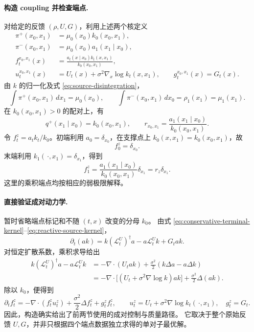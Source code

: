 \documentclass[UTF8,a4paper,11pt,fontset=fandol]{ctexart}
\begin{document}
\paragraph{构造 coupling 并检查端点.}
对给定的反馈 $(\rho,U,G)$，利用上述两个核定义
\begin{equation}
\begin{aligned}
\pi^+(x_0,x_1)&=\mu_0(x_0)k_0(x_0,x_1),\\
\pi^-(x_0,x_1)&=\mu_0(x_0)a_1(x_1\mid x_0),\\
f_t^{x_0,x_1}(x)
&=\frac{a_t(x\mid x_0)k_t(x,x_1)}{k_0(x_0,x_1)},\\
u_t^{x_0,x_1}(x)&=U_t(x)+\sigma^2\nabla_x\log k_t(x,x_1),
\qquad g_t^{x_0,x_1}(x)=G_t(x).
\end{aligned}
\label{eq:feedback-pair-lift}
\end{equation}
由 $k$ 的归一化及式 \eqref{eq:source-disintegration}，
\begin{equation}
\int\pi^+(x_0,x_1)\,dx_1=\mu_0(x_0),
\qquad
\int\pi^-(x_0,x_1)\,dx_0=\rho_1(x_1)=\mu_1(x_1).
\end{equation}
在 $k_0(x_0,x_1)>0$ 的配对上，有
\begin{equation}
q^+(x_1\mid x_0)=k_0(x_0,x_1),
\qquad
r_{x_0,x_1}=\frac{a_1(x_1\mid x_0)}{k_0(x_0,x_1)}.
\end{equation}
令 $f_t^z=a_tk_t/k_0$。初端利用
$a_0=\delta_{x_0}$，在支撑点上 $k_0(x,x_1)=k_0(x_0,x_1)$，故
\begin{equation}
f_0^z=\delta_{x_0}.
\end{equation}
末端利用 $k_1(\,\cdot,x_1)=\delta_{x_1}$，得到
\begin{equation}
f_1^z
=\frac{a_1(x_1\mid x_0)}{k_0(x_0,x_1)}\delta_{x_1}
=r_z\delta_{x_1}.
\end{equation}
这里的乘积端点均按相应的弱极限解释。

\paragraph{直接验证成对动力学.}
暂时省略端点标记和不随 $(t,x)$ 改变的分母 $k_0$。
由式 \eqref{eq:conservative-terminal-kernel}--\eqref{eq:reactive-source-kernel}，
\begin{equation}
\partial_t(ak)
=k(\mathcal L_t^U)^\dagger a-a\mathcal L_t^Uk+G_tak.
\end{equation}
对恒定扩散系数，乘积求导给出
\begin{equation}
\begin{aligned}
k(\mathcal L_t^U)^\dagger a-a\mathcal L_t^Uk
&=-\nabla\cdot(U_tak)
+\frac{\sigma^2}{2}(k\Delta a-a\Delta k)\\
&=-\nabla\cdot\bigl[(U_t+\sigma^2\nabla\log k)ak\bigr]
+\frac{\sigma^2}{2}\Delta(ak).
\end{aligned}
\end{equation}
除以 $k_0$，便得到
\begin{equation}
\partial_tf_t^z
=-\nabla\cdot(f_t^zu_t^z)+\frac{\sigma^2}{2}\Delta f_t^z+g_t^zf_t^z,
\qquad
u_t^z=U_t+\sigma^2\nabla\log k_t(\,\cdot,x_1),\quad g_t^z=G_t.
\end{equation}
因此，构造确实给出了前两节使用的成对控制与质量路径。
它取决于整个原始反馈 $U,G$，并非只根据四个端点数据独立求得的单对子最优解。
\end{document}
